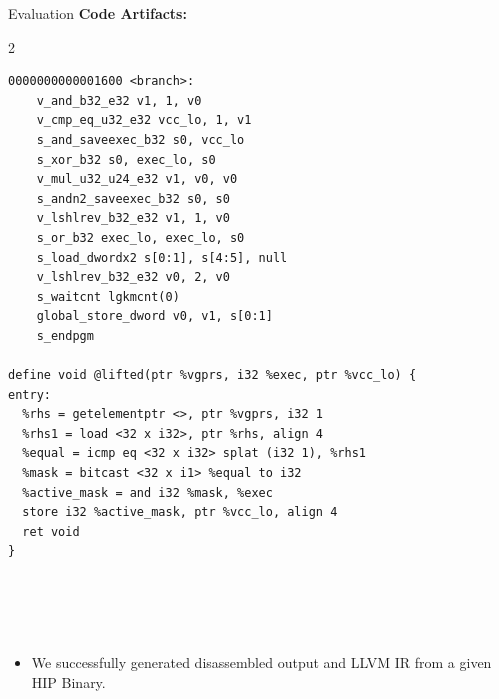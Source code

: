 \documentclass[10pt,aspectratio=169]{beamer}
\begin{document}
    \begin{frame}[fragile]{Evaluation}
        \textbf{Code Artifacts:} 
        \begin{multicols}{2}
{\scriptsize 

\begin{verbatim}
0000000000001600 <branch>:
    v_and_b32_e32 v1, 1, v0                           
    v_cmp_eq_u32_e32 vcc_lo, 1, v1                      
    s_and_saveexec_b32 s0, vcc_lo                        
    s_xor_b32 s0, exec_lo, s0                             
    v_mul_u32_u24_e32 v1, v0, v0                            
    s_andn2_saveexec_b32 s0, s0                              
    v_lshlrev_b32_e32 v1, 1, v0                               
    s_or_b32 exec_lo, exec_lo, s0                              
    s_load_dwordx2 s[0:1], s[4:5], null                        
    v_lshlrev_b32_e32 v0, 2, v0                                
    s_waitcnt lgkmcnt(0)                                       
    global_store_dword v0, v1, s[0:1]                          
    s_endpgm           

define void @lifted(ptr %vgprs, i32 %exec, ptr %vcc_lo) {
entry:
  %rhs = getelementptr <>, ptr %vgprs, i32 1
  %rhs1 = load <32 x i32>, ptr %rhs, align 4
  %equal = icmp eq <32 x i32> splat (i32 1), %rhs1
  %mask = bitcast <32 x i1> %equal to i32
  %active_mask = and i32 %mask, %exec
  store i32 %active_mask, ptr %vcc_lo, align 4
  ret void
}





\end{verbatim}

}
       \end{multicols}
    \begin{itemize}
        \item We successfully generated disassembled output and LLVM IR from a given HIP Binary.
    \end{itemize}
	\end{frame}
\end{document}
